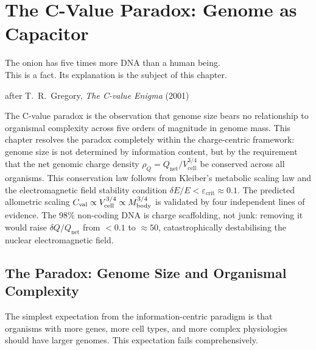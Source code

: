 
\chapter{The C-Value Paradox: Genome as Capacitor}
\label{chap:cvalue_paradox}

\epigraph{%
  The onion has five times more DNA than a human being.\\
  This is a fact. Its explanation is the subject of this chapter.%
}{after T.\ R.\ Gregory, \textit{The C-value Enigma} (2001)}

\begin{chapterbox}
The C-value paradox is the observation that genome size bears no
relationship to organismal complexity across five orders of magnitude in
genome mass. This chapter resolves the paradox completely within the
charge-centric framework: genome size is not determined by information
content, but by the requirement that the net genomic charge density
$\rho_Q = Q_{\mathrm{net}} / V_{\mathrm{cell}}^{3/4}$ be conserved
across all organisms. This conservation law follows from Kleiber's
metabolic scaling law and the electromagnetic field stability condition
$\delta E / E < \varepsilon_{\mathrm{crit}} \approx 0.1$. The predicted
allometric scaling $C_{\mathrm{val}} \propto V_{\mathrm{cell}}^{3/4} \propto M_{\mathrm{body}}^{3/4}$
is validated by four independent lines of evidence. The 98\% non-coding
DNA is charge scaffolding, not junk: removing it would raise
$\delta Q / Q_{\mathrm{net}}$ from $<0.1$ to $\approx 50$, catastrophically
destabilising the nuclear electromagnetic field.
\end{chapterbox}

\section{The Paradox: Genome Size and Organismal Complexity}
\label{sec:paradox_statement}

The simplest expectation from the information-centric paradigm is that
organisms with more genes, more cell types, and more complex physiologies
should have larger genomes. This expectation fails comprehensively.

